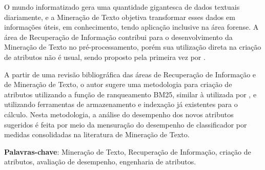 \setlength{\absparsep}{18pt} %
\begin{resumo}
    
    O mundo informatizado gera uma quantidade gigantesca de dados textuais diariamente, e a Mineração de Texto objetiva transformar esses dados em informações úteis, em conhecimento, tendo aplicação inclusive na área forense.
    A área de Recuperação de Informação contribui para o desenvolvimento da Mineração de Texto no pré-processamento, porém sua utilização direta na criação de atributos não é usual, sendo proposto pela primeira vez por .
    
    A partir de uma revisão bibliográfica das áreas de Recuperação de Informação e de Mineração de Texto, o autor sugere uma metodologia para criação de atributos utilizando a função de ranqueamento BM25, similar à utilizada por , e utilizando ferramentas de armazenamento e indexação já existentes para o cálculo.
    Nesta metodologia, a análise do desempenho dos novos atributos sugeridos é feita por meio da mensuração do desempenho de classificador por medidas consolidadas na literatura de Mineração de Texto.
    
    \vspace{\onelineskip}
    
	\noindent
    \textbf{Palavras-chave}: Mineração de Texto, Recuperação de Informação, criação de atributos, avaliação de desempenho, engenharia de atributos.
    
\end{resumo}